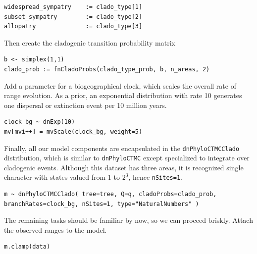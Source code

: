 \begin{snugshade}
\begin{lstlisting}
widespread_sympatry    := clado_type[1]
subset_sympatry        := clado_type[2]
allopatry              := clado_type[3]
\end{lstlisting}
\end{snugshade}

Then create the cladogenic transition probability matrix

\begin{snugshade}
\begin{lstlisting}
b <- simplex(1,1)
clado_prob := fnCladoProbs(clado_type_prob, b, n_areas, 2)
\end{lstlisting}
\end{snugshade}

Add a parameter for a biogeographical clock, which scales the overall rate of range evolution.
As a prior, an exponential distribution with rate 10 generates one dispersal or extinction event per 10 million years.

\begin{snugshade}
\begin{lstlisting}
clock_bg ~ dnExp(10)
mv[mvi++] = mvScale(clock_bg, weight=5)
\end{lstlisting}
\end{snugshade}

Finally, all our model components are encapsulated in the {\tt dnPhyloCTMCClado} distribution, which is similar to {\tt dnPhyloCTMC} except specialized to integrate over cladogenic events. Although this dataset has three areas, it is recognized single character with states valued from 1 to $2^3$, hence {\tt nSites=1}.

\begin{snugshade}
\begin{lstlisting}
m ~ dnPhyloCTMCClado( tree=tree, Q=q, cladoProbs=clado_prob, branchRates=clock_bg, nSites=1, type="NaturalNumbers" )
\end{lstlisting}
\end{snugshade}

The remaining tasks should be familiar by now, so we can proceed briskly. Attach the observed ranges to the model.

\begin{snugshade}
\begin{lstlisting}
m.clamp(data)
\end{lstlisting}
\end{snugshade}

